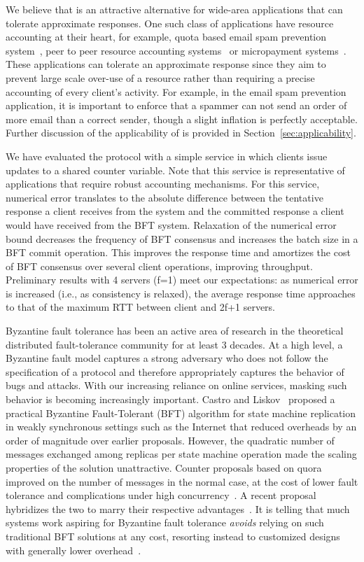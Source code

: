 \documentclass[twocolumn,10pt]{article}
\begin{document}
We believe that \Sys is an attractive alternative for wide-area applications that can 
tolerate approximate responses. One such class of applications have resource accounting at 
their heart, for example, quota based email spam prevention system~\cite{Walfish2006},
peer to peer resource accounting systems~\cite{karma-p2pecon-03} or micropayment
systems~\cite{ppay-ccs-03}. These applications can tolerate an approximate response since they
aim to prevent large scale over-use of a resource rather than requiring a precise
accounting of every client's activity.
For example, in the email spam prevention application, it is important to enforce that a spammer
can not send an order of more email than a correct sender, though a slight inflation is 
perfectly acceptable. Further discussion of the applicability of \Sys
is provided in Section~\ref{sec:applicability}. 

We have evaluated the \Sys protocol with a simple service in which clients
issue updates to a shared counter variable. Note that this service is representative of 
applications that require robust accounting mechanisms.  For this service, 
numerical error translates to the absolute difference between the tentative 
response a client receives from the \Sys system and the
committed response a client would have received from the BFT system. 
Relaxation of the numerical error bound decreases the
frequency of BFT consensus and increases the batch size in a BFT commit operation.
This improves the response time and amortizes the cost of BFT consensus over several
client operations, improving throughput. Preliminary results with 
4 servers (f=1) meet our
expectations: as numerical error is increased (i.e., as consistency is relaxed), the average response
time approaches to that of the maximum RTT between client and 2f+1 servers.

Byzantine fault tolerance has been an active area of research in the
theoretical distributed fault-tolerance community for at least 3
decades. At a high level, a Byzantine fault model captures a strong
adversary who does not follow the specification of a protocol and
therefore appropriately captures the behavior of bugs and attacks. With
our increasing reliance on online services, masking such behavior is
becoming increasingly important.  Castro and Liskov~\cite{Castro1999}
proposed a practical Byzantine Fault-Tolerant (BFT) algorithm for state
machine replication in weakly synchronous settings such as the Internet
that reduced overheads by an order of magnitude over earlier
proposals. However, the quadratic number of messages exchanged among
replicas per state machine operation made the scaling properties of the
solution unattractive.  Counter proposals based on quora improved on the
number of messages in the normal case, at the cost of lower fault
tolerance and complications under high
concurrency~\cite{fault-scalable-sosp-05}. A recent proposal hybridizes
the two to marry their respective
advantages~\cite{hq-replication-osdi-06}.
It is telling that much systems work aspiring for Byzantine fault
tolerance \emph{avoids} relying on such traditional BFT solutions at any
cost, resorting instead to customized designs with generally lower 
overhead~\cite{Walfish2006,ppay-ccs-03,karma-p2pecon-03,secure-routing-osdi-02,oceanstore-asplos-2000}.
\end{document}
